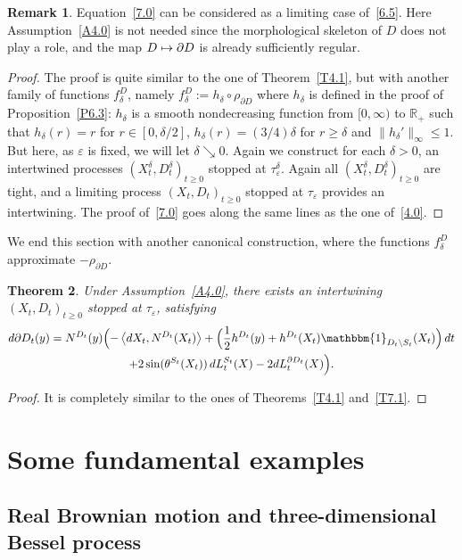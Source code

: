 \documentclass[10pt]{amsart}
\let\backslash\setminus
\newcommand\mto{\mathchoice{\longmapsto}{\mapsto}{\mapsto}{\mapsto}}
\theoremstyle{plain}
\newtheorem{thm}{Theorem}[section]
\theoremstyle{definition}
\newtheorem{remark}[thm]{Remark}
\newcommand{\RR}{{\mathbb R}}
\newcommand{\un}{\mathbbm{1}}
\let\f\frac
\let\d\delta
\let\e\varepsilon
\begin{document}
\begin{remark}
Equation~\eqref{7.0} can be considered as a limiting case of~\eqref{6.5}. Here Assumption~\ref{A4.0} is not needed since the morphological skeleton of $D$ does not play a role, and the map $D\mto \partial D$ is already sufficiently regular.
\end{remark}

\begin{proof}
The proof is quite similar to the one of Theorem~\ref{T4.1}, but with another family of functions $f_\d^D$, namely $f_\d^D:=h_\d\circ \rho_{\partial D}$ where $h_\d$ is defined in the proof of Proposition~\ref{P6.3}: $h_\d$ is a smooth nondecreasing function from $[0,\infty)$ to $\RR_+$ such that $h_\d(r)=r$ for $r\in [0,\d/2]$, $h_\d(r)=(3/4)\d$ for $r\ge \d$ and $\|h_\d'\|_\infty\le 1$. But here, as $\e$ is fixed, we will let $\d\searrow 0$. Again we construct for
each $\d>0$, an intertwined processes $(X_t^\d,D_t^\d)_{t\ge 0}$ stopped at $\tau_\e^\d$. Again
all $(X_t^\d,D_t^\d)_{t\ge 0}$ are tight, and a limiting process $(X_t,D_t)_{t\ge 0}$ stopped at $\tau_\e$ provides an intertwining. The proof of~\eqref{7.0} goes along the same lines as the one of~\eqref{4.0}.
\end{proof}

We end this section with another canonical construction, where the functions $f_\d^D$ approximate $-\rho_{\partial D}$.
\begin{thm}
\label{T7.2}
Under Assumption~\ref{A4.0},
there exists an intertwining $(X_t,D_t)_{t\ge0}$ stopped at $\tau_\e$, satisfying
\begin{multline}
d\partial D_t(y)=N^{D_t}(y)\Bigl(-\left\langle dX_t, N^{D_t}(X_t)\right\rangle +\Bigl(\f12 h^{D_t}(y)+h^{D_t}(X_t) \un_{D_t \backslash S_t}(X_t) \Bigr)\,dt\\
+2\sin(\theta^{S_t}(X_t))\, dL_t^{S_t}(X) -2dL_t^{\partial D_t}(X)\Bigr).
\end{multline}
\end{thm}
\begin{proof}
It is completely similar to the ones of Theorems~\ref{T4.1} and~\ref{T7.1}.
\end{proof}
\section{Some fundamental examples}
\label{Section5}

\subsection{Real Brownian motion and three-dimensional Bessel process}
\label{Subsection5.1}
\end{document}
